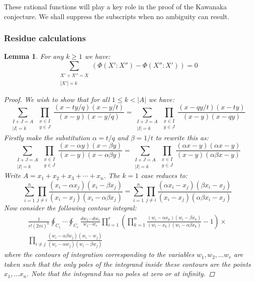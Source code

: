 \documentclass[12pt,dvips]{amsart}
\newtheorem{lemma}{Lemma}[section]
\begin{document}
\medskip
\noindent
These rational functions will play a key role in the proof of the Kawanaka conjecture. We shall suppress the subscripts when no ambiguity can result.


\subsubsection{Residue calculations}
\begin{lemma} \label{inflim} For any $k \geq 1$ we have:
$$ \sum_{\substack{X' + X'' = X \\ |X'| = k}}\left( \Phi(X' : X'') - \Phi(X'' : X' )\right ) = 0 
$$
\begin{proof}
We wish to show that for all $1 \leq k < |A|$ we have:
\[ 
\sum_{\substack{I + J = A \\ |I| = k}} \prod_{\substack{x \in I \\ y \in J}}\frac{(x - ty/q)(x - y/t)}{(x - y)(x - y/q)}
= \sum_{\substack{I + J = A \\ |I| = k}} \prod_{\substack{x \in I \\ y \in J}}\frac{(x - qy/t)(x - ty)}{(x - y)(x - qy)}
\] 
Firstly make the substitution $ \alpha = t/q$ and $\beta = 1/t$ to rewrite this as:
\[ 
\sum_{\substack{I + J = A \\ |I| = k}} \prod_{\substack{x \in I \\ y \in J}}\frac{(x - \alpha y)(x - \beta y)}{(x - y)(x - \alpha \beta y)}
= \sum_{\substack{I + J = A \\ |I| = k}} \prod_{\substack{x \in I \\ y \in J}}\frac{(\alpha x - y)(\alpha x - y)}{(x - y)(\alpha \beta x - y)}
\] 
Write $A = x_1 + x_2 + x_3 + \cdots + x_n$. The $k=1$ case reduces to:
\[
\sum_{i=1}^n \prod_{j \neq i} \frac{(x_i - \alpha x_j)(x_i - \beta x_j)}{(x_i - x_j)(x_i - \alpha \beta x_j)}
= \sum_{i=1}^n \prod_{j \neq i} \frac{(\alpha x_i - x_j)(\beta x_i - x_j)}{(x_i - x_j)(\alpha \beta x_i - x_j)}
\]
Now consider the following contour integral:
\begin{multline*}
\frac{1}{r!(2 \pi i)^k} \oint_{C_1} \cdots \oint_{C_{r}} \frac{d w_1 \cdots d w_{r}}{w_1 \cdots w_{r}} 
\prod_{i=1}^{r} \left ( \prod_{k = 1}^n \frac{(w_i - \alpha x_k)(w_i - \beta x_k)}{(w_i - x_k)(w_i - \alpha \beta x_k)} - 1 \right ) \times \\
\prod_{i \neq j} \frac{(w_i - \alpha \beta w_j)(w_i - w_j)}{(w_i - \alpha w_j)(w_i - \beta w_j)}
\end{multline*}
where the contours of integration corresponding to the variables $w_1, w_2, \ldots w_r$ are taken such that the only poles of the integrand inside these contours are the points $x_1, \ldots x_n$. Note that the integrand has no poles at zero or at infinity.


\end{proof}
\end{lemma}
\end{document}

